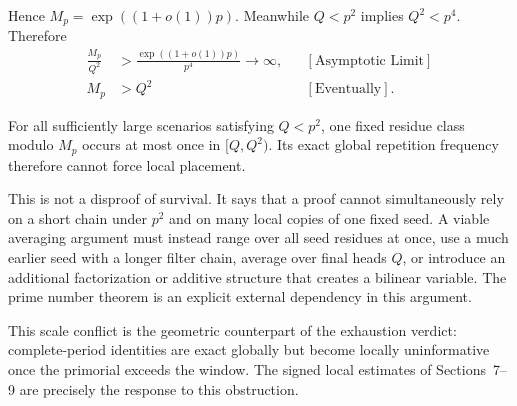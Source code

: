 Hence $M_p=\exp((1+o(1))p)$. Meanwhile $Q<p^2$ implies $Q^2<p^4$. Therefore
\begin{equation*}
\begin{aligned}
\frac{M_p}{Q^2}
&>\frac{\exp((1+o(1))p)}{p^4}
\longrightarrow\infty,
&&[\text{Asymptotic Limit}]\\
M_p&>Q^2
&&[\text{Eventually}].
\end{aligned}
\end{equation*}

For all sufficiently large scenarios satisfying $Q<p^2$, one fixed residue
class modulo $M_p$ occurs at most once in $[Q,Q^2)$. Its exact global
repetition frequency therefore cannot force local placement.

This is not a disproof of survival. It says that a proof cannot simultaneously
rely on a short chain under $p^2$ and on many local copies of one fixed seed.
A viable averaging argument must instead range over all seed residues at
once, use a much earlier seed with a longer filter chain, average over final
heads $Q$, or introduce an additional factorization or additive structure
that creates a bilinear variable. The prime number theorem is an explicit
external dependency in this argument.

This scale conflict is the geometric counterpart of the exhaustion verdict:
complete-period identities are exact globally but become locally uninformative
once the primorial exceeds the window. The signed local estimates of Sections~7--9
are precisely the response to this obstruction.
